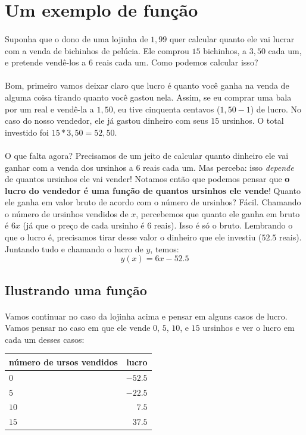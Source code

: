 \documentclass[11pt]{article}
\begin{document}
\section{Um exemplo de função}
\paragraph{}
Suponha que o dono de uma lojinha de $1,99$ quer calcular quanto ele vai lucrar
com a venda de bichinhos de pelúcia. Ele comprou $15$ bichinhos, a $3,50$ cada
um, e pretende vendê-los a $6$ reais cada um. Como podemos calcular isso?
\paragraph{}
Bom, primeiro vamos deixar claro que lucro é quanto você ganha na venda de 
alguma coisa tirando quanto você gastou nela. Assim, se eu comprar uma bala
por um real e vendê-la a $1,50$, eu tive cinquenta centavos ($1,50 - 1$) de 
lucro. No caso do nosso vendedor, ele já gastou dinheiro com seus $15$
ursinhos. O total investido foi $15*3,50 = 52,50$. 
\paragraph{}
O que falta agora? Precisamos de um jeito de calcular quanto dinheiro ele vai 
ganhar com a venda dos ursinhos a $6$ reais cada um. Mas perceba: 
isso \emph{depende} de quantos ursinhos ele vai vender! 
Notamos então que podemos pensar que 
\textbf{o lucro do vendedor é uma função de quantos ursinhos ele vende}! 
Quanto ele ganha em valor bruto de acordo com o número de ursinhos? Fácil.
Chamando o número de ursinhos vendidos de $x$, percebemos que quanto ele ganha
em bruto é $6x$ (já que o preço de cada ursinho é $6$ reais). Isso é só o 
bruto. Lembrando o que o lucro é, precisamos tirar desse valor o dinheiro que 
ele investiu ($52.5$ reais). Juntando tudo e chamando o lucro de $y$, temos:
$$y(x) = 6x - 52.5$$

\subsection{Ilustrando uma função}
\paragraph{}
Vamos continuar no caso da lojinha acima e pensar em alguns casos de lucro.
Vamos pensar no caso em que ele vende $0$, $5$, $10$, e $15$ ursinhos e ver
o lucro em cada um desses casos:
\newline
\newline
\begin{tabular}{|l | r|}
	\hline
	número de ursos vendidos & lucro \\
	\hline
	$0$ & $-52.5$ \\	
	$5$ & $-22.5$ \\	
	$10$ & $7.5$ \\	
	$15$ & $37.5$ \\	
	\hline
\end{tabular}
\end{document}
